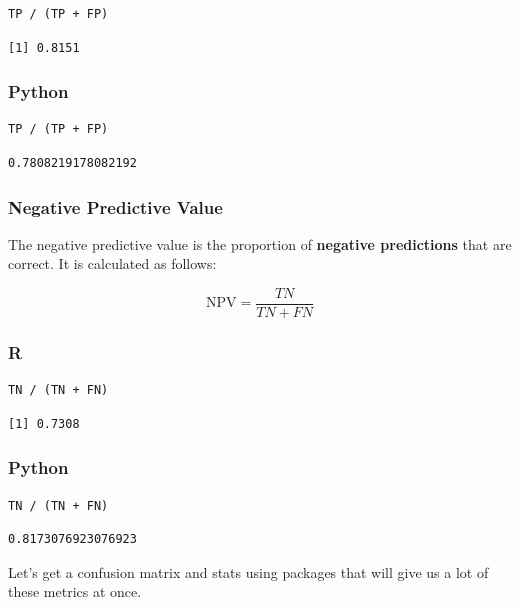 \documentclass[
  letterpaper,
]{krantz}
\begin{document}
\begin{verbatim}
TP / (TP + FP)
\end{verbatim}

\begin{verbatim}
[1] 0.8151
\end{verbatim}

\subsubsection{Python}

\begin{verbatim}
TP / (TP + FP)
\end{verbatim}

\begin{verbatim}
0.7808219178082192
\end{verbatim}

\subsubsection{Negative Predictive Value}\label{sec-knowing-metrics-npv}

The negative predictive value is the proportion of \textbf{negative
predictions} that are correct. It is calculated as follows:

\[\text{NPV} = \frac{TN}{TN + FN}\]

\subsubsection{R}

\begin{verbatim}
TN / (TN + FN)
\end{verbatim}

\begin{verbatim}
[1] 0.7308
\end{verbatim}

\subsubsection{Python}

\begin{verbatim}
TN / (TN + FN)
\end{verbatim}

\begin{verbatim}
0.8173076923076923
\end{verbatim}

Let's get a confusion matrix and stats using packages that will give us
a lot of these metrics at once.
\end{document}
